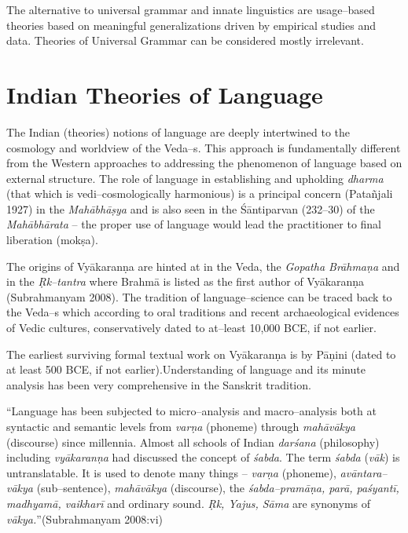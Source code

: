 The alternative to universal grammar and innate linguistics are usage–based theories based on meaningful generalizations driven by empirical studies and data. Theories of Universal Grammar can be considered mostly irrelevant. 

\vskip -26pt


\section*{Indian Theories of Language}

\vskip -6pt

The Indian (theories) notions of language are deeply intertwined to the cosmology and worldview of the Veda–s. This approach is fundamentally different from the Western approaches to addressing the phenomenon of language based on external structure. The role of language in establishing and upholding \textit{dharma} (that which is vedi–cosmologically harmonious) is a principal concern (Patañjali 1927) in the \textit{Mahābhāṣya} and is also seen in the Śāntiparvan (232–30) of the \textit{Mahābhārata} – the proper use of language would lead the practitioner to final liberation (mokṣa).

The origins of Vyākaranṇa are hinted at in the Veda, the \textit{Gopatha Brāhmaṇa} and in the \textit{Ṛk–tantra} where Brahmā is listed as the first author of Vyākaranṇa (Subrahmanyam 2008). The tradition of language–science can be traced back to the Veda–s which according to oral traditions and recent archaeological evidences of Vedic cultures, conservatively dated to at–least 10,000 BCE, if not earlier.

The earliest surviving formal textual work on Vyākaranṇa is by Pāṇini (dated to at least 500 BCE, if not earlier).Understanding of language and its minute analysis has been very comprehensive in the Sanskrit tradition.

\begin{myquote}
“Language has been subjected to micro–analysis and macro–analysis both at syntactic and semantic levels from \textit{varṇa} (phoneme) through \textit{mahāvākya} (discourse) since millennia. Almost all schools of Indian \textit{darśana} (philosophy) including \textit{vyākaranṇa} had discussed the concept of \textit{śabda}. The term \textit{śabda} (\textit{vāk}) is untranslatable. It is used to denote many things – \textit{varṇa} (phoneme), \textit{avāntara–vākya} (sub–sentence), \textit{mahāvākya} (discourse), the \textit{śabda–pramāṇa, parā, paśyantī, madhyamā, vaikharī} and ordinary sound. \textit{Ṛk, Yajus, Sāma} are synonyms of \textit{vākya.}”\hfill (Subrahmanyam 2008:vi)
\end{myquote}

